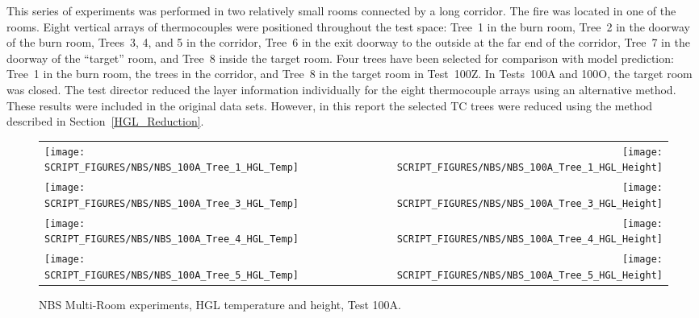 This series of experiments was performed in two relatively small rooms connected by a long corridor. The fire was located in one of the rooms.  Eight vertical arrays of thermocouples were positioned throughout the test space: Tree~1 in the burn room, Tree~2 in the doorway of the burn room, Trees~3, 4, and 5 in the corridor, Tree~6 in the exit doorway to the outside at the far end of the corridor, Tree~7 in the doorway of the ``target'' room, and Tree~8 inside the target room.  Four trees have been selected for comparison with model prediction: Tree~1 in the burn room, the trees in the corridor, and Tree~8 in the target room in Test~100Z. In Tests~100A and 100O, the target room was closed. The test director reduced the layer information individually for the eight thermocouple arrays using an alternative method. These results were included in the original data sets. However, in this report the selected TC trees were reduced using the method described in Section~\ref{HGL_Reduction}.

\newpage

\begin{figure}[p]
\begin{tabular*}{\textwidth}{l@{\extracolsep{\fill}}r}
\texttt{[image: SCRIPT\_FIGURES/NBS/NBS\_100A\_Tree\_1\_HGL\_Temp]} &
\texttt{[image: SCRIPT\_FIGURES/NBS/NBS\_100A\_Tree\_1\_HGL\_Height]} \\
\texttt{[image: SCRIPT\_FIGURES/NBS/NBS\_100A\_Tree\_3\_HGL\_Temp]} &
\texttt{[image: SCRIPT\_FIGURES/NBS/NBS\_100A\_Tree\_3\_HGL\_Height]} \\
\texttt{[image: SCRIPT\_FIGURES/NBS/NBS\_100A\_Tree\_4\_HGL\_Temp]} &
\texttt{[image: SCRIPT\_FIGURES/NBS/NBS\_100A\_Tree\_4\_HGL\_Height]} \\
\texttt{[image: SCRIPT\_FIGURES/NBS/NBS\_100A\_Tree\_5\_HGL\_Temp]} &
\texttt{[image: SCRIPT\_FIGURES/NBS/NBS\_100A\_Tree\_5\_HGL\_Height]}
\end{tabular*}
\caption[NBS Multi-Room experiments, HGL temperature and height, Test 100A]
{NBS Multi-Room experiments, HGL temperature and height, Test 100A.}
\label{NBS_HGL_1}
\end{figure}

